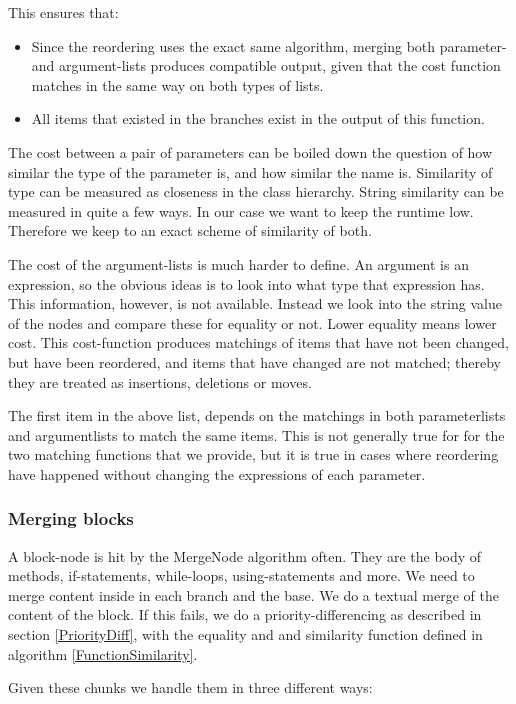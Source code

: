 \documentclass[11pt]{article}
\begin{document}
This ensures that:

\begin{itemize}
   \item Since the reordering uses the exact same algorithm, merging both parameter- and argument-lists produces compatible output, given that the cost function matches in the same way on both types of lists.
   \item All items that existed in the branches exist in the output of this function. 
\end{itemize}

The cost between a pair of parameters can be boiled down the question of how similar the type of the parameter is, and how similar the name is. Similarity of type can be measured as closeness in the class hierarchy. String similarity can be measured in quite a few ways. In our case we want to keep the runtime low. Therefore we keep to an exact scheme of similarity of both.

The cost of the argument-lists is much harder to define. An argument is an expression, so the obvious ideas is to look into what type that expression has. This information, however, is not available. Instead we look into the string value of the nodes and compare these for equality or not. Lower equality means lower cost. This cost-function produces matchings of items that have not been changed, but have been reordered, and items that have changed are not matched; thereby they are treated as insertions, deletions or moves.

The first item in the above list, depends on the matchings in both parameterlists and argumentlists to match the same items. This is not generally true for for the two matching functions that we provide, but it is true in cases where reordering have happened without changing the expressions of each parameter.


\subsubsection{Merging blocks}
A block-node is hit by the MergeNode algorithm often. They are the body of methods, if-statements, while-loops, using-statements and more. We need to merge content inside in each branch and the base. We do a textual merge of the content of the block. If this fails, we do a priority-differencing as described in section \ref{PriorityDiff}, with the equality and and similarity function defined in algorithm \ref{FunctionSimilarity}.

Given these chunks we handle them in three different ways: 
\end{document}
